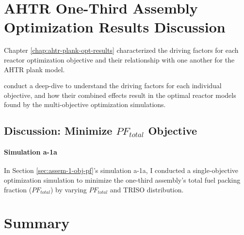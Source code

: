 \section{AHTR One-Third Assembly Optimization Results Discussion}
\label{sec:assem-discussion}
Chapter \ref{chap:ahtr-plank-opt-results} characterized the driving factors for 
each reactor optimization objective and their relationship with one another for the 
\gls{AHTR} plank model. 

conduct a deep-dive to understand the driving factors for 
each individual objective, and how their combined effects result in the optimal 
reactor models found by the multi-objective optimization simulations. 

\subsection{Discussion: Minimize $PF_{total}$ Objective}
\label{sec:assem-discussion-pf}
\paragraph{Simulation a-1a}
In Section \ref{sec:assem-1-obj-pf}'s simulation a-1a, I conducted a single-objective 
optimization simulation to minimize the one-third assembly's total fuel packing fraction 
($PF_{total}$) by varying $PF_{total}$ and TRISO distribution. 

\section{Summary}